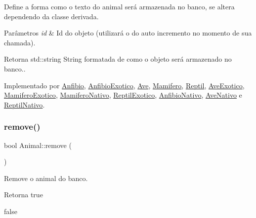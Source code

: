 Define a forma como o texto do animal será armazenada no banco, se altera dependendo da classe derivada. 


\begin{DoxyParams}{Parâmetros}
{\em id} & Id do objeto (utilizará o do auto incremento no momento de sua chamada). \\
\hline
\end{DoxyParams}
\begin{DoxyReturn}{Retorna}
std\+::string String formatada de como o objeto será armazenado no banco.. 
\end{DoxyReturn}


Implementado por \hyperlink{classAnfibio_ab866ca21fb00c2d4d571aadd271eadec}{Anfibio}, \hyperlink{classAnfibioExotico_a08d9debec54258a0f43c8c503dfb23d0}{Anfibio\+Exotico}, \hyperlink{classAve_ab858405e18c56876e331ad943885ee53}{Ave}, \hyperlink{classMamifero_ae91b67a8f0f508793a801aadcaa18570}{Mamifero}, \hyperlink{classReptil_a53fd59f3aed9c2d463722a8e97401406}{Reptil}, \hyperlink{classAveExotico_a4ba81def12131f047b3800e5f10a983b}{Ave\+Exotico}, \hyperlink{classMamiferoExotico_a4ee6f5f4a2917cfdf54304525add0c4a}{Mamifero\+Exotico}, \hyperlink{classMamiferoNativo_ae2f2b00cb6720cea2780ebef78be52ea}{Mamifero\+Nativo}, \hyperlink{classReptilExotico_a71312f425b92e04d8f29a856abd83f26}{Reptil\+Exotico}, \hyperlink{classAnfibioNativo_a7926e1af44542ee268e27dd3d862f583}{Anfibio\+Nativo}, \hyperlink{classAveNativo_ab95679ed20354b2183706db24899d316}{Ave\+Nativo} e \hyperlink{classReptilNativo_ac801a11c87a2847fb4b46488aa6bb789}{Reptil\+Nativo}.

\mbox{\label{classAnimal_a0aea60eaeb4d8f1d68d2c37e279d2d20}} 
\subsubsection{\texorpdfstring{remove()}{remove()}}
{\footnotesize\ttfamily bool Animal\+::remove (\begin{DoxyParamCaption}{ }\end{DoxyParamCaption})}



Remove o animal do banco. 

\begin{DoxyReturn}{Retorna}
true 

false 
\end{DoxyReturn}
\mbox{\label{classAnimal_a0733e9c19d226749195ebe9e64df8964}} 

